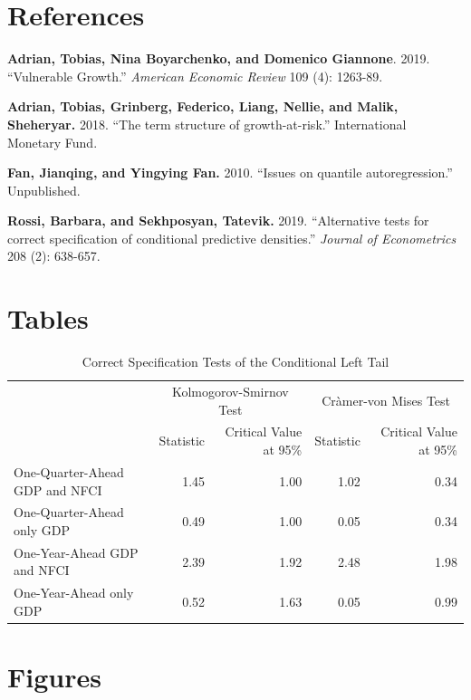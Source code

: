 \documentclass[12pt,]{article}
\begin{document}
\hypertarget{references}{%
\section{References}\label{references}}

\textbf{Adrian, Tobias, Nina Boyarchenko, and Domenico Giannone}. 2019.
``Vulnerable Growth.'' \emph{American Economic Review} 109 (4): 1263-89.

\textbf{Adrian, Tobias, Grinberg, Federico, Liang, Nellie, and Malik,
Sheheryar.} 2018. ``The term structure of growth-at-risk.''
International Monetary Fund.

\textbf{Fan, Jianqing, and Yingying Fan.} 2010. ``Issues on quantile
autoregression.'' Unpublished.

\textbf{Rossi, Barbara, and Sekhposyan, Tatevik.} 2019. ``Alternative
tests for correct specification of conditional predictive densities.''
\emph{Journal of Econometrics} 208 (2): 638-657.

\hypertarget{tables}{%
\section{Tables}\label{tables}}

\begin{longtable}{lrrrr}
\caption{\label{tab:table1}Correct Specification Tests of the Conditional Left Tail}\\
\toprule
\multicolumn{1}{c}{ } & \multicolumn{2}{c}{Kolmogorov-Smirnov Test} & \multicolumn{2}{c}{Cràmer-von Mises Test} \\
\cmidrule(l{3pt}r{3pt}){2-3} \cmidrule(l{3pt}r{3pt}){4-5}
  & Statistic & Critical Value at 95\% & Statistic & Critical Value at 95\%\\
\midrule
One-Quarter-Ahead GDP and NFCI & 1.45 & 1.00 & 1.02 & 0.34\\
One-Quarter-Ahead only GDP & 0.49 & 1.00 & 0.05 & 0.34\\
One-Year-Ahead GDP and NFCI & 2.39 & 1.92 & 2.48 & 1.98\\
One-Year-Ahead only GDP & 0.52 & 1.63 & 0.05 & 0.99\\
\bottomrule
\end{longtable}

\hypertarget{figures}{%
\section{Figures}\label{figures}}
\end{document}
